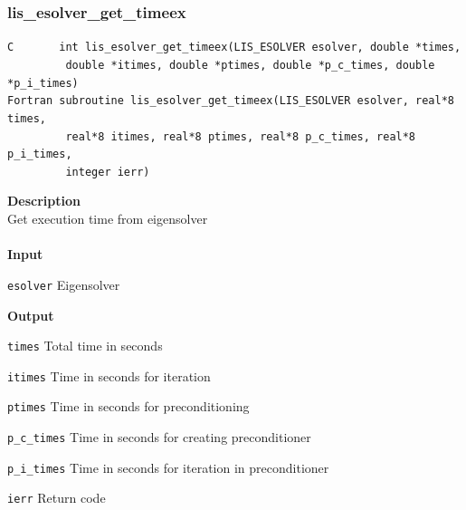 \documentclass[a4paper]{article}
\newcommand{\namelistlabel}[1]{\mbox{#1}\hfill}
\newenvironment{namelist}[1]{%
 \begin{list}{}
  {\let\makelabel\namelistlabel
  \settowidth{\labelwidth}{#1}
  \setlength{\leftmargin}{1.1\labelwidth}}
}{%
\end{list}}
\begin{document}
  \subsubsection{lis\_esolver\_get\_timeex}
\begin{screen}
\verb|C       int lis_esolver_get_timeex(LIS_ESOLVER esolver, double *times,|\\
\verb|         double *itimes, double *ptimes, double *p_c_times, double *p_i_times)|\\
\verb|Fortran subroutine lis_esolver_get_timeex(LIS_ESOLVER esolver, real*8 times,|\\
\verb|         real*8 itimes, real*8 ptimes, real*8 p_c_times, real*8 p_i_times,|\\
\verb|         integer ierr)|
\end{screen}
{\bf Description}\\
\indent
Get execution time from eigensolver
\\ \\
\noindent
{\bf Input}
\begin{namelist}{XXXXXXXXXXXXXXXXXXXX}
\item[\tt esolver] Eigensolver
\end{namelist}
{\bf Output}
\begin{namelist}{XXXXXXXXXXXXXXXXXXXX}
\item[\tt times] Total time in seconds
\item[\tt itimes] Time in seconds for iteration
\item[\tt ptimes] Time in seconds for preconditioning
\item[\tt p\_c\_times] Time in seconds for creating preconditioner
\item[\tt p\_i\_times] Time in seconds for iteration in preconditioner
\item[\tt ierr] Return code
\end{namelist}
\end{document}
